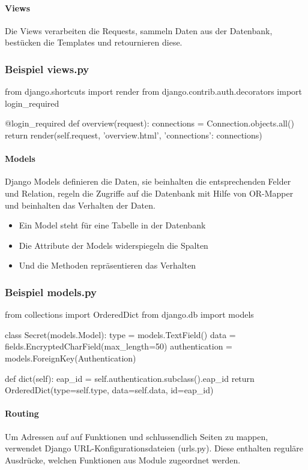 \paragraph{Views} Die Views verarbeiten die Requests, sammeln Daten aus der Datenbank, bestücken die Templates und retournieren diese.

\subsubsection{Beispiel views.py}
\begin{python}
from django.shortcuts import render
from django.contrib.auth.decorators import login_required

@login_required
def overview(request):
        connections = Connection.objects.all()
        return render(self.request, 'overview.html', {'connections': connections})
\end{python}

\paragraph{Models} Django Models definieren die Daten, sie beinhalten die entsprechenden Felder und Relation, regeln die Zugriffe auf die Datenbank mit Hilfe von OR-Mapper und beinhalten das Verhalten der Daten.
\begin{itemize}
	\item Ein Model steht für eine Tabelle in der Datenbank
	\item Die Attribute der Models widerspiegeln die Spalten
	\item Und die Methoden repräsentieren das Verhalten
\end{itemize}

\subsubsection{Beispiel models.py}
\begin{python}
from collections import OrderedDict
from django.db import models

class Secret(models.Model):
    type = models.TextField()
    data = fields.EncryptedCharField(max_length=50)
    authentication = models.ForeignKey(Authentication)

    def dict(self):
        eap_id = self.authentication.subclass().eap_id
        return OrderedDict(type=self.type, data=self.data, id=eap_id)
\end{python}


\paragraph{Routing} Um Adressen auf auf Funktionen und schlussendlich Seiten zu mappen, verwendet Django URL-Konfigurationsdateien (urls.py). Diese enthalten reguläre Ausdrücke, welchen Funktionen aus Module zugeordnet 
werden.

